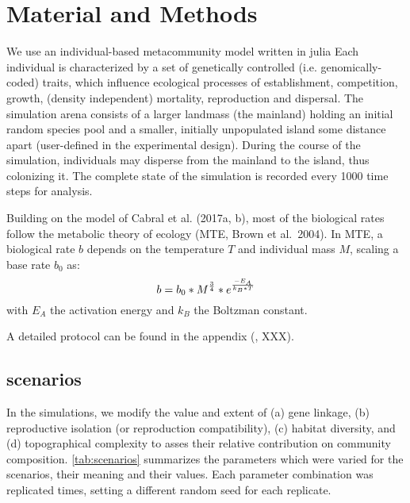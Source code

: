 \documentclass[a4paper]{scrartcl}
\begin{document}
\section{Material and Methods}
We use an individual-based metacommunity model written in julia %
Each individual is characterized by a set of genetically controlled (i.e. genomically-coded) traits, which influence ecological processes of
establishment, competition, growth, (density independent) mortality, reproduction and dispersal.
The simulation arena consists of a larger landmass (the mainland) holding an initial random species pool and a smaller, initially unpopulated island some distance apart (user-defined in the experimental design). %
During the course of the simulation, individuals may disperse from the mainland to the island, thus colonizing it. 
The complete state of the simulation is recorded every 1000 time steps for analysis.

Building on the model of Cabral et al. (2017a, b), most of the biological rates follow the metabolic theory
of ecology (MTE, Brown et al.\ 2004). %
In MTE, a biological rate $b$ depends on the temperature $T$ and individual mass $M$, scaling a base rate $b_0$ as:
\begin{equation}
  b=b_0*M^{3\over4}*e^{-{E_A}\over{k_B*T}}
  \label{eq:MTE}
\end{equation}
with $E_A$ the activation energy and $k_B$ the Boltzman constant.

A detailed protocol can be found in the appendix (\cite{grimm2010odd}, XXX).

\subsection{scenarios}
In the simulations, we modify the value and extent of
(a) gene linkage,
(b) reproductive isolation (or reproduction compatibility),
(c) habitat diversity, and
(d) topographical complexity
to asses their relative contribution on community composition.
\cref{tab:scenarios} summarizes the parameters which were varied for the scenarios, their meaning and their values. %
Each parameter combination was replicated %
times, setting a different random seed for each replicate.
\end{document}
